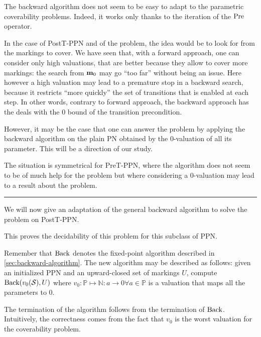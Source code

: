 The backward algorithm does not seem to be easy to adapt to the parametric coverability problems.
Indeed, it works only thanks to the iteration of the $\operatorname{Pre}$ operator.

In the case of PostT-\ac{PPN} and of the \Ecov problem, the idea would be to look for \mari from the markings to cover.
We have seen that, with a forward approach, one can consider only high valuations, that are better because they allow to cover more markings: the search from $\mathbf{m}_0$ may go ``too far'' without being an issue.
Here however a high valuation may lead to a premature stop in a backward search, because it restricts ``more quickly'' the set of transitions that is enabled at each step.
In other words, contrary to forward approach, the backward approach has the deals with the 0 bound of the transition precondition. 

However, it may be the case that one can answer the \Ucov problem by applying the backward algorithm on the plain \ac{PN} obtained by the 0-valuation of all its parameter.
This will be a direction of our study.

The situation is symmetrical for PreT-\ac{PPN}, where the algorithm does not seem to be of much help for the \Ucov problem but where considering a 0-valuation may lead to a result about the \Ecov problem.

\rule{5cm}{1pt}

We will now give an adaptation of the general backward algorithm to solve the \Ucov problem on PostT-\ac{PPN}.

This proves the decidability of this problem for this subclass of \ac{PPN}.

Remember that $\operatorname{Back}$ denotes the fixed-point algorithm described in \autoref{sec:backward-algorithm}.
The new algorithm may be described as follows:
given an initialized \ac{PPN} \SPTPm and an upward-closed set of markings $U$, compute $\operatorname{Back}(v_0(\mathcal{S}), U)$ where $v_0 : \mathbb{P} \mapsto \mathbb{N} : a \rightarrow 0 \forall a \in \mathbb{P}$ is a valuation that maps all the parameters to 0.

The termination of the algorithm follows from the termination of $\operatorname{Back}$.
Intuitively, the correctness comes from the fact that $v_0$ is the worst valuation for the coverability problem.

